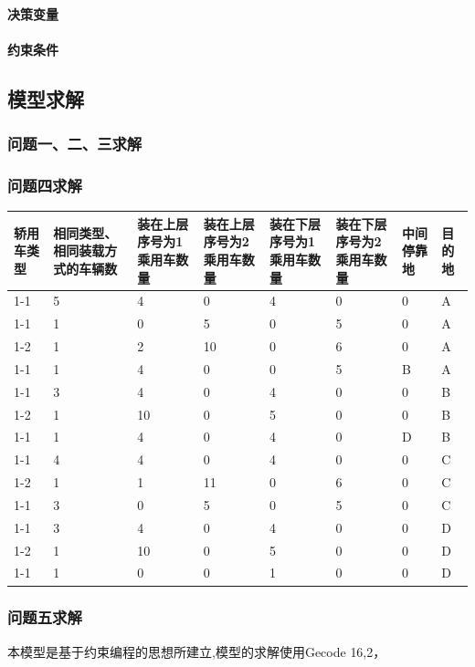 \documentclass[UTF8]{ctexart}
\begin{document}
	\paragraph{决策变量}
	\paragraph{约束条件}
\subsection{模型求解}
\subsubsection{问题一、二、三求解}

\subsubsection{问题四求解}
\begin{table}[h!]
\centering
\begin{tabular}{|p{1.5cm}|p{1.5cm}|p{1.5cm}|p{1.5cm}|p{1.5cm}|p{1.5cm}|p{1.5cm}|p{1.5cm}|}
\hline
轿用车类型&相同类型、相同装载方式的车辆数&装在上层序号为1乘用车数量&装在上层序号为2乘用车数量&装在下层序号为1乘用车数量&装在下层序号为2乘用车数量&中间停靠地&目的地\\\hline
1-1&	5&	4&	0&	4&	0&	0&	A\\\hline
1-1&1&0&5&0&5&0&A\\\hline
1-2&1&2&10&0&6&0&A\\\hline
1-1&1&4&0&0&5&B&A\\\hline
1-1&3&4&0&4&0&0&B\\\hline
1-2&1&10&0&5&0&0&B\\\hline
1-1&1&4&0&4&0&D&B\\\hline
1-1&4&4&0&4&0&0&C\\\hline
1-2&1&1&11&0&6&0&C\\\hline
1-1&3&0&5&0&5&0&C\\\hline
1-1&3&4&0&4&0&0&D\\\hline
1-2&1&10&0&5&0&0&D\\\hline
1-1&1&0&0&1&0&0&D\\\hline	
\end{tabular}
\end{table}


\subsubsection{问题五求解}
本模型是基于约束编程的思想所建立,模型的求解使用Gecode \cite{gecode}
16,2，
\end{document}
